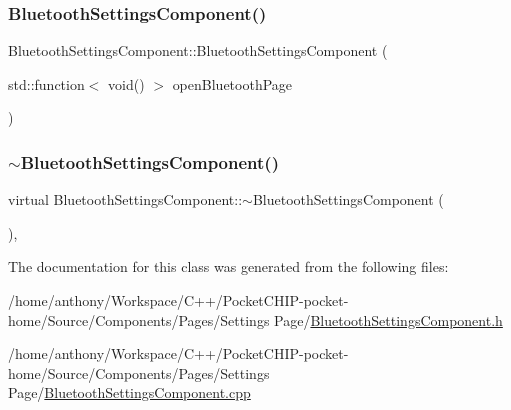 \subsubsection{\texorpdfstring{Bluetooth\+Settings\+Component()}{BluetoothSettingsComponent()}}
{\footnotesize\ttfamily Bluetooth\+Settings\+Component\+::\+Bluetooth\+Settings\+Component (\begin{DoxyParamCaption}\item[{std\+::function$<$ void() $>$}]{open\+Bluetooth\+Page }\end{DoxyParamCaption})}

\mbox{\label{classBluetoothSettingsComponent_a0826ee95e3050234298f267dd3ed5285}} 
\subsubsection{\texorpdfstring{$\sim$\+Bluetooth\+Settings\+Component()}{~BluetoothSettingsComponent()}}
{\footnotesize\ttfamily virtual Bluetooth\+Settings\+Component\+::$\sim$\+Bluetooth\+Settings\+Component (\begin{DoxyParamCaption}{ }\end{DoxyParamCaption})\hspace{0.3cm}{\ttfamily [inline]}, {\ttfamily [virtual]}}



The documentation for this class was generated from the following files\+:\begin{DoxyCompactItemize}
\item 
/home/anthony/\+Workspace/\+C++/\+Pocket\+C\+H\+I\+P-\/pocket-\/home/\+Source/\+Components/\+Pages/\+Settings Page/\mbox{\hyperlink{BluetoothSettingsComponent_8h}{Bluetooth\+Settings\+Component.\+h}}\item 
/home/anthony/\+Workspace/\+C++/\+Pocket\+C\+H\+I\+P-\/pocket-\/home/\+Source/\+Components/\+Pages/\+Settings Page/\mbox{\hyperlink{BluetoothSettingsComponent_8cpp}{Bluetooth\+Settings\+Component.\+cpp}}\end{DoxyCompactItemize}
